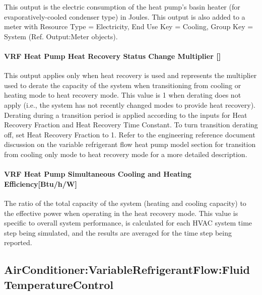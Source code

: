 This output is the electric consumption of the heat pump's basin heater (for evaporatively-cooled condenser type) in Joules. This output is also added to a meter with Resource Type = Electricity, End Use Key = Cooling, Group Key = System (Ref. Output:Meter objects).

\paragraph{\texorpdfstring{VRF Heat Pump Heat Recovery Status Change Multiplier {[]}}{VRF Heat Pump Heat Recovery Status Change Multiplier }}\label{vrf-heat-pump-heat-recovery-status-change-multiplier}

This output applies only when heat recovery is used and represents the multiplier used to derate the capacity of the system when transitioning from cooling or heating mode to heat recovery mode. This value is 1 when derating does not apply (i.e., the system has not recently changed modes to provide heat recovery). Derating during a transition period is applied according to the inputs for Heat Recovery Fraction and Heat Recovery Time Constant. To turn transition derating off, set Heat Recovery Fraction to 1. Refer to the engineering reference document discussion on the variable refrigerant flow heat pump model section for transition from cooling only mode to heat recovery mode for a more detailed description.

\paragraph{\texorpdfstring{VRF Heat Pump Simultaneous Cooling and Heating Efficiency{[}Btu/h/W{]}}{VRF Heat Pump Simultaneous Cooling and Heating Efficiency}}\label{vrf-heat-pump-simultaneous-cooling-and-heating-efficiency}

The ratio of the total capacity of the system (heating and cooling capacity) to the effective power when operating in the heat recovery mode. This value is specific to overall system performance, is calculated for each HVAC system time step being simulated, and the results are averaged for the time step being reported.

\subsection{AirConditioner:VariableRefrigerantFlow:FluidTemperatureControl}\label{airconditionervariablerefrigerantflowfluidtemperaturecontrol}
